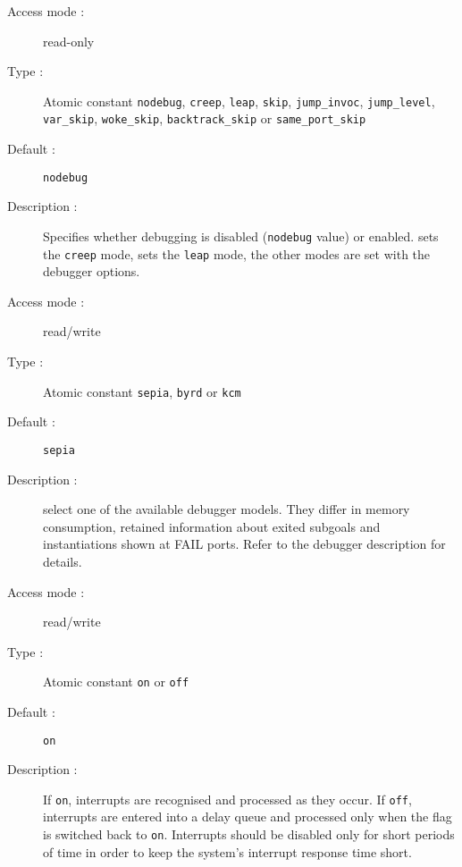 \begin{description}
\begin{description}
\item[Access mode :] read-only
\item[Type :] Atomic constant {\tt nodebug}, {\tt creep}, {\tt leap}, {\tt skip}, {\tt jump_invoc}, {\tt jump_level}, {\tt var_skip}, {\tt woke_skip}, {\tt backtrack_skip} or {\tt same_port_skip}
\item[Default : ] {\tt nodebug}
\item[Description :] Specifies whether debugging is disabled
({\tt nodebug} value)
or enabled.  sets the {\tt creep} mode,  sets the
{\tt leap} mode, the other modes are set with the debugger options.
\end{description}

\begin{description}
\item[Access mode :] read/write
\item[Type :] Atomic constant {\tt sepia}, {\tt byrd} or {\tt kcm}
\item[Default : ] {\tt sepia}
\item[Description :] select one of the available debugger models.
They differ in memory consumption, retained information about exited subgoals
and instantiations shown at FAIL ports. Refer to the debugger description
for details.
\end{description}


\begin{description}
\item[Access mode :] read/write
\item[Type :] Atomic constant {\tt on} or {\tt off}
\item[Default : ] {\tt on}
\item[Description :] If {\tt on}, interrupts are recognised and processed
as they occur. If {\tt off}, interrupts are entered into a delay queue and
processed only when the flag is switched back to {\tt on}.
Interrupts should be disabled only for short periods of time in order to keep
the system's interrupt response time short.
\end{description}


\end{description}
